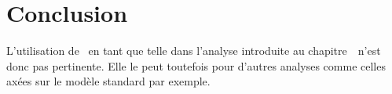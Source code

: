 \section{Conclusion}\label{chapter-ML-section-conclusion}


L'utilisation de \mml\ en tant que telle dans l'analyse introduite au chapitre~\ n'est donc pas pertinente.
Elle le peut toutefois pour d'autres analyses comme celles axées sur le modèle standard par exemple.